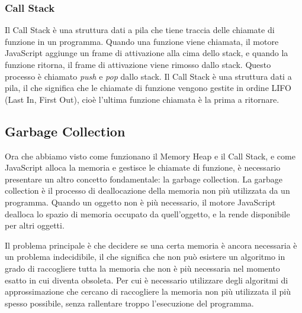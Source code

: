 \subsubsection{Call Stack}
Il Call Stack è una struttura dati a pila che tiene traccia delle chiamate di funzione in un programma. Quando una funzione viene chiamata, il motore JavaScript aggiunge un frame di attivazione alla cima dello stack, e quando la funzione ritorna, il frame di attivazione viene rimosso dallo stack. Questo processo è chiamato \textit{push} e \textit{pop} dallo stack. Il Call Stack è una struttura dati a pila, il che significa che le chiamate di funzione vengono gestite in ordine LIFO (Last In, First Out), cioè l'ultima funzione chiamata è la prima a ritornare.

\subsection{Garbage Collection}
Ora che abbiamo visto come funzionano il Memory Heap e il Call Stack, e come JavaScript alloca la memoria e gestisce le chiamate di funzione, è necessario presentare un altro concetto fondamentale: la garbage collection.
La garbage collection è il processo di deallocazione della memoria non più utilizzata da un programma. Quando un oggetto non è più necessario, il motore JavaScript dealloca lo spazio di memoria occupato da quell'oggetto, e la rende disponibile per altri oggetti.

Il problema principale è che decidere se una certa memoria è ancora necessaria è un problema indecidibile, il che significa che non può esistere un algoritmo in grado di raccogliere tutta la memoria che non è più necessaria nel momento esatto in cui diventa obsoleta. Per cui è necessario utilizzare degli algoritmi di approssimazione che cercano di raccogliere la memoria non più utilizzata il più spesso possibile, senza rallentare troppo l'esecuzione del programma.

